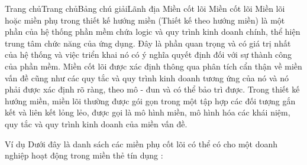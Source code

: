

Trang chủTrang chủBảng chú giảiLãnh địa Miền cốt lõi
Miền cốt lõi
Miền lõi hoặc miền phụ trong thiết kế hướng miền (Thiết kế theo hướng miền) là một phần của hệ thống phần mềm chứa logic và quy trình kinh doanh chính, thể hiện trung tâm chức năng của ứng dụng. Đây là phần quan trọng và có giá trị nhất của hệ thống và việc triển khai nó có ý nghĩa quyết định đối với sự thành công của phần mềm. Miền cốt lõi được xác định thông qua phân tích cẩn thận về miền vấn đề cũng như các quy tắc và quy trình kinh doanh tương ứng của nó và nó phải được xác định rõ ràng, theo mô - đun và có thể bảo trì được. Trong thiết kế hướng miền, miền lõi thường được gói gọn trong một tập hợp các đối tượng gắn kết và liên kết lỏng lẻo, được gọi là mô hình miền, mô hình hóa các khái niệm, quy tắc và quy trình kinh doanh của miền vấn đề.

Ví dụ
Dưới đây là danh sách các miền phụ cốt lõi có thể có cho một doanh nghiệp hoạt động trong miền thẻ tín dụng :

